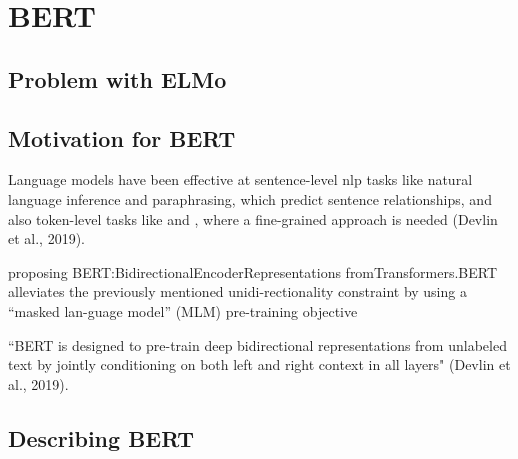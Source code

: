 \section{BERT} \label{sec:BERT}

\subsection{Problem with ELMo} \label{sec:ProblemWithELMo}

\subsection{Motivation for BERT} \label{sec:MotivationForBERT}

Language models have been effective at sentence-level nlp tasks like natural language inference and paraphrasing, which predict sentence relationships, and also token-level tasks like  and , where a fine-grained approach is needed (Devlin et al., 2019). 

 proposing   BERT:BidirectionalEncoderRepresentations   fromTransformers.BERT alleviates the previously mentioned unidi-rectionality  constraint  by  using  a  “masked  lan-guage  model”  (MLM)  pre-training  objective

``BERT is designed to pre-train deep bidirectional representations from unlabeled text by jointly conditioning on both left and right context in all layers" (Devlin et al., 2019).


\subsection{Describing BERT} \label{sec:DescribingBERT}





